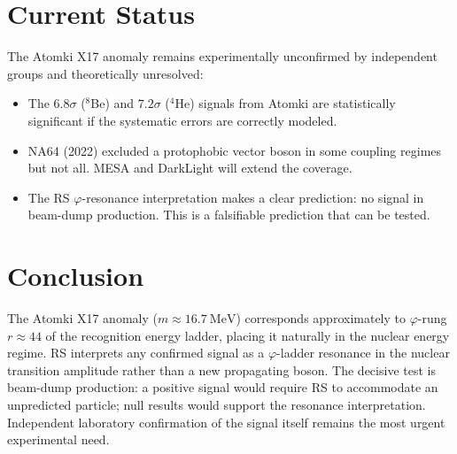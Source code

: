 \documentclass[12pt,a4paper]{article}
\theoremstyle{definition}
\theoremstyle{remark}
\begin{document}
\section{Current Status}
\label{sec:status}

The Atomki X17 anomaly remains experimentally unconfirmed by
independent groups and theoretically unresolved:
\begin{itemize}
  \item The $6.8\sigma$ (${}^8$Be) and $7.2\sigma$ (${}^4$He) signals
  from Atomki are statistically significant if the systematic errors
  are correctly modeled.
  \item NA64 (2022) excluded a protophobic vector boson in some coupling
  regimes~\cite{NA642019} but not all.  MESA and DarkLight will extend
  the coverage.
  \item The RS $\varphi$-resonance interpretation makes a clear
  prediction: no signal in beam-dump production.  This is a falsifiable
  prediction that can be tested.
\end{itemize}

\section{Conclusion}
\label{sec:conclusion}

The Atomki X17 anomaly ($m \approx 16.7~\mathrm{MeV}$) corresponds
approximately to $\varphi$-rung $r \approx 44$ of the recognition
energy ladder, placing it naturally in the nuclear energy regime.
RS interprets any confirmed signal as a $\varphi$-ladder resonance in
the nuclear transition amplitude rather than a new propagating boson.
The decisive test is beam-dump production: a positive signal would
require RS to accommodate an unpredicted particle; null results would
support the resonance interpretation.  Independent laboratory
confirmation of the signal itself remains the most urgent experimental
need.
\end{document}
